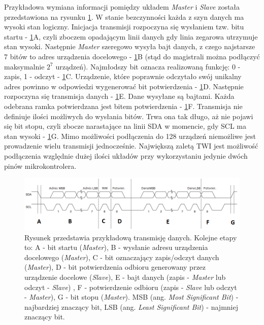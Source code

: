 \newline
\noindent
Przykładowa wymiana informacji pomiędzy układem \textit{Master} i \textit{Slave} została przedstawiona na rysunku \ref{trans_TWI}. W stanie bezczynności każda z szyn danych ma wysoki stan logiczny. Inicjacja transmisji rozpoczyna się wysłaniem tzw. bitu startu - \ref{trans_TWI}A, czyli zboczem opadającym linii danych gdy linia zegarowa utrzymuje stan wysoki. Następnie \textit{Master} szeregowo wysyła bajt danych, z czego najstarsze 7 bitów to adres urządzenia docelowego - \ref{trans_TWI}B (stąd do magistrali można podłączyć maksymalnie $2^7$ urządzeń). Najmłodszy bit oznacza realizowaną funkcję: 0 - zapis, 1 - odczyt - \ref{trans_TWI}C. Urządzenie, które poprawnie odczytało swój unikalny adres powinno w odpowiedzi wygenerować bit potwierdzenia - \ref{trans_TWI}D. Następnie rozpoczyna się transmisja danych - \ref{trans_TWI}E. Dane wysyłane są bajtami. Każda odebrana ramka potwierdzana jest bitem potwierdzenia - \ref{trans_TWI}F. Transmisja nie definiuje ilości możliwych do wysłania bitów. Trwa ona tak długo, aż nie pojawi się bit stopu, czyli zbocze narastające na linii SDA w momencie, gdy SCL ma stan wysoki - \ref{trans_TWI}G. Mimo możliwości podłączenia do 128 urządzeń niemożliwe jest prowadzenie wielu transmisji jednocześnie. Największą zaletą TWI jest możliwość podłączenia względnie dużej ilości układów przy wykorzystaniu jedynie dwóch pinów mikrokontrolera. 
\begin{figure}[H]
    \begin{center}
      \includegraphics[scale=0.6]{imgs/transmisja_twi.png}
 	\caption[Transmisja TWI.]{\small{Rysunek przedstawia przykładową transmisję danych. Kolejne etapy to: A - bit startu (\textit{Master}), B - wysłanie adresu urządzenia docelowego (\textit{Master}), C - bit oznaczający zapis/odczyt danych (\textit{Master}), D - bit potwierdzenia odbioru generowany przez urządzenie docelowe (\textit{Slave}), E - bajt danych (zapis - \textit{Master} lub odczyt - \textit{Slave}) , F - potwierdzenie odbioru (zapis - \textit{Slave} lub odczyt - \textit{Master}), G - bit stopu (\textit{Master}). MSB (ang. \textit{Most Significant Bit}) - najbardziej znaczący bit, LSB (ang. \textit{Least Significant Bit}) - najmniej znaczący bit. }\footnotemark}
	\label{trans_TWI}
    \end{center}
  \end{figure}  
  	  
